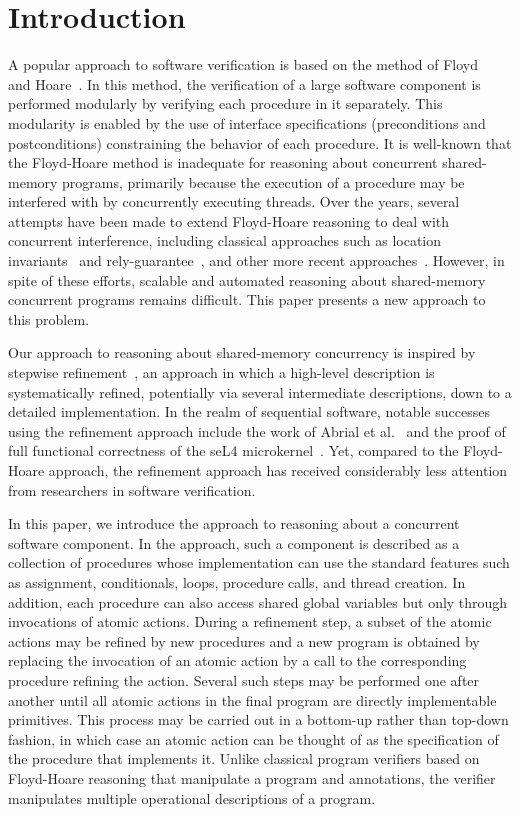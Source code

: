 \section{Introduction}
\label{sec:introduction}

A popular approach to software verification is based on the method of Floyd~\cite{Floyd67} and Hoare~\cite{Hoare69}.
In this method, the verification of a large software component is performed modularly by verifying each procedure in it separately.
This modularity is enabled by the use of interface specifications (preconditions and postconditions) constraining the behavior of each procedure.
It is well-known that the Floyd-Hoare method is inadequate for reasoning about concurrent shared-memory programs,
primarily because the execution of a procedure may be interfered with by concurrently executing threads.
Over the years, several attempts have been made to extend Floyd-Hoare reasoning to deal with concurrent interference, 
including classical approaches such as location invariants~\cite{Ashcroft75,OwickiG76} and rely-guarantee~\cite{Jones83},
and other more recent approaches~\cite{OHearn07,RGSep}.
However, in spite of these efforts, scalable and automated reasoning about shared-memory concurrent programs remains difficult.
This paper presents a new approach to this problem.

Our approach to reasoning about shared-memory concurrency is inspired by stepwise refinement~\cite{Dijkstra}, 
an approach in which a high-level description is systematically refined, 
potentially via several intermediate descriptions, down to a detailed implementation.
In the realm of sequential software, notable successes using the refinement approach include the work of Abrial et al.~\cite{AbrialBHHMV10}
and the proof of full functional correctness of the seL4 microkernel~\cite{KleinAEMSKH14}.
Yet, compared to the Floyd-Hoare approach, 
the refinement approach has received considerably less attention from researchers in software verification.

In this paper, we introduce the \civl approach to reasoning about a concurrent software component.
In the \civl approach, such a component is described as a collection of procedures whose implementation 
can use the standard features such as assignment, conditionals, loops, procedure calls, and thread creation. 
In addition, each procedure can also access shared global variables but only through invocations of atomic actions.
During a refinement step, a subset of the atomic actions may be refined by new procedures and a new program is 
obtained by replacing the invocation of an atomic action by a call to the corresponding procedure refining the action.
Several such steps may be performed one after another until all atomic actions in the final program are directly implementable primitives.
This process may be carried out in a bottom-up rather than top-down fashion, in which case an atomic action 
can be thought of as the specification of the procedure that implements it.
Unlike classical program verifiers based on Floyd-Hoare reasoning that manipulate a program and annotations, 
the \civl verifier manipulates multiple operational descriptions of a program. 

